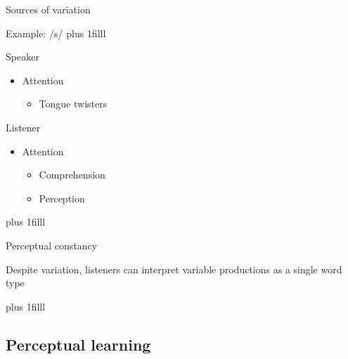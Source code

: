 \documentclass{beamer}
\newcommand{\btVFill}{\vskip0pt plus 1filll}
\begin{document}
\begin{frame}{Sources of variation}

Example: /s/
\btVFill
\begin{minipage}[t]{0.45\textwidth}
Speaker

\begin{itemize}
\item Attention
\begin{itemize}
\item Tongue twisters
\end{itemize}

\end{itemize}
\end{minipage}
\hfill
\begin{minipage}[t]{0.45\textwidth}
Listener

\begin{itemize}
\item Attention
\begin{itemize}
\item Comprehension
\item Perception
\end{itemize}
\end{itemize}
\end{minipage}
\btVFill
\begin{flushright}
\scriptsize
\citet{Nozari2012, Pitt2012}
\end{flushright}
\end{frame}

\begin{frame}{Perceptual constancy}
\vfill
\begin{center}
Despite variation, listeners can interpret variable productions as a single word type
\vfill
{}

\end{center}
\btVFill

\begin{flushright}
\scriptsize
\citet{Shankweiler1977, Kuhl1979,Sumner2013}
\end{flushright}
\end{frame}

\subsection{Perceptual learning}
\end{document}

